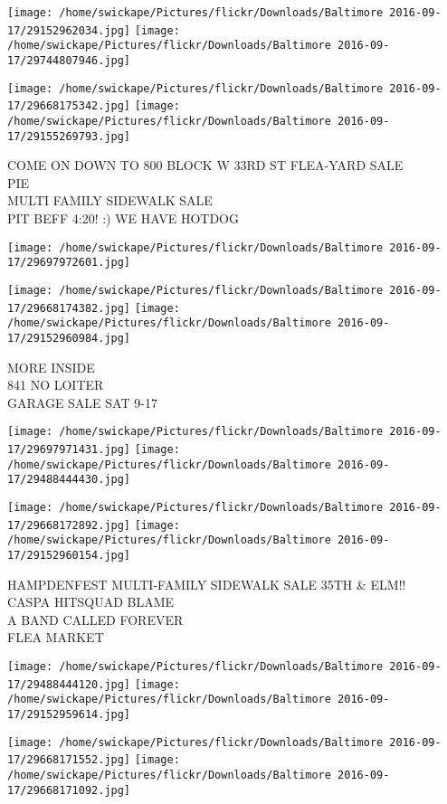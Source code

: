 \documentclass[10pt,letterpaper]{article}
\begin{document}
\texttt{[image: /home/swickape/Pictures/flickr/Downloads/Baltimore 2016-09-17/29152962034.jpg]}
\texttt{[image: /home/swickape/Pictures/flickr/Downloads/Baltimore 2016-09-17/29744807946.jpg]}

\texttt{[image: /home/swickape/Pictures/flickr/Downloads/Baltimore 2016-09-17/29668175342.jpg]}
\texttt{[image: /home/swickape/Pictures/flickr/Downloads/Baltimore 2016-09-17/29155269793.jpg]}

COME ON DOWN TO 800 BLOCK W 33RD ST FLEA{-}YARD SALE\\
PIE\\
MULTI FAMILY SIDEWALK SALE\\
PIT BEFF 4:20! :) WE HAVE HOTDOG
\pagebreak

\texttt{[image: /home/swickape/Pictures/flickr/Downloads/Baltimore 2016-09-17/29697972601.jpg]}

\vspace{0.25in}
\texttt{[image: /home/swickape/Pictures/flickr/Downloads/Baltimore 2016-09-17/29668174382.jpg]}
\texttt{[image: /home/swickape/Pictures/flickr/Downloads/Baltimore 2016-09-17/29152960984.jpg]}

MORE INSIDE\\
841 NO LOITER\\
GARAGE SALE SAT 9{-}17
\pagebreak

\texttt{[image: /home/swickape/Pictures/flickr/Downloads/Baltimore 2016-09-17/29697971431.jpg]}
\texttt{[image: /home/swickape/Pictures/flickr/Downloads/Baltimore 2016-09-17/29488444430.jpg]}

\texttt{[image: /home/swickape/Pictures/flickr/Downloads/Baltimore 2016-09-17/29668172892.jpg]}
\texttt{[image: /home/swickape/Pictures/flickr/Downloads/Baltimore 2016-09-17/29152960154.jpg]}

HAMPDENFEST MULTI{-}FAMILY SIDEWALK SALE 35TH \& ELM!!\\
CASPA HITSQUAD BLAME\\
A BAND CALLED FOREVER\\
FLEA MARKET
\pagebreak

\texttt{[image: /home/swickape/Pictures/flickr/Downloads/Baltimore 2016-09-17/29488444120.jpg]}
\texttt{[image: /home/swickape/Pictures/flickr/Downloads/Baltimore 2016-09-17/29152959614.jpg]}

\texttt{[image: /home/swickape/Pictures/flickr/Downloads/Baltimore 2016-09-17/29668171552.jpg]}
\texttt{[image: /home/swickape/Pictures/flickr/Downloads/Baltimore 2016-09-17/29668171092.jpg]}
\end{document}
